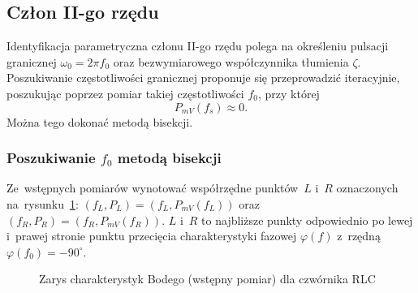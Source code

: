 \documentclass[paper=a4,DIV=12]{lpas}
\newcommand{\degree}{^{\circ}}
\begin{document}
\begin{appendices}
  \subsection{Człon II-go rzędu}
  \label{sec:YDUPM}

  Identyfikacja parametryczna członu II-go rzędu polega na określeniu pulsacji
  granicznej $\omega_0 = 2 \pi f_0$ oraz bezwymiarowego współczynnika tłumienia
  $\zeta$. Poszukiwanie częstotliwości granicznej proponuje się przeprowadzić
  iteracyjnie, poszukując poprzez pomiar takiej częstotliwości $f_0$, przy
  której
  \begin{equation}
    P_{mV}(f_s) \approx 0.
    \label{eq:8AO8B}
  \end{equation}
  Można tego dokonać metodą bisekcji.

  \subsubsection{Poszukiwanie \texorpdfstring{$f_0$}{f0} metodą bisekcji}
  \label{sec:HVY4X}

  Ze~wstępnych pomiarów wynotować współrzędne punktów~$L$ i~$R$ oznaczonych
  na~rysunku~\ref{fig:WC8TU}: $(f_L, P_L) = (f_L, P_{mV}(f_L))$ oraz $(f_R,
  P_R) = (f_R, P_{mV}(f_R))$. $L$ i~$R$ to najbliższe punkty odpowiednio po
  lewej i~prawej stronie punktu przecięcia charakterystyki fazowej $\varphi(f)$
  z~rzędną $\varphi(f_0) = - 90\degree$.

  \begin{figure}[H]
    \centering
    
    \caption{Zarys charakterystyk Bodego (wstępny pomiar) dla czwórnika RLC}
    \label{fig:WC8TU}
  \end{figure}


\end{appendices}
\end{document}
